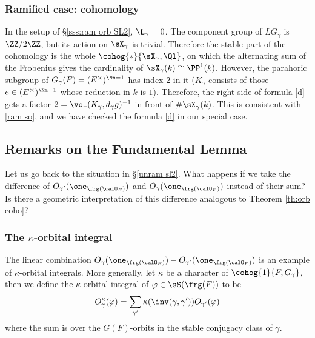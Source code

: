 \subsubsection{Ramified case: cohomology} In the setup of \S\ref{sss:ram orb SL2}, $\L_{\gamma}=0$. The component group of $LG_{\gamma}$ is $\ZZ/2\ZZ$, but its action on $\sX_{\gamma}$ is trivial. Therefore the stable part of the cohomology is the whole $\cohog{*}{\sX_{\gamma},\Ql}$, on which the alternating sum of the Frobenius gives the cardinality of $\sX_{\gamma}(k)\cong\PP^{1}(k)$.
However, the parahoric subgroup of $G_{\gamma}(F)=(E^{\times})^{\Nm=1}$ has index $2$ in it ($K_{\gamma}$ consists of those $e\in (E^{\times})^{\Nm=1}$ whose reduction in $k$ is $1$). Therefore, the right side of formula \eqref{d} gets a factor $2=\vol(K_{\gamma},d_{\gamma}g)^{-1}$ in front of $\#\sX_{\gamma}(k)$. This is consistent with \eqref{ram so}, and we have checked the formula \eqref{d} in our special case.

\subsection{Remarks on the Fundamental Lemma} Let us go back to the situation in  \S\ref{unram sl2}. What happens if we take the difference of $O_{\gamma'}(\one_{\frg(\calO_{F})})$ and $O_{\gamma}(\one_{\frg(\calO_{F})})$ instead of their sum? Is there a geometric interpretation of this difference analogous to Theorem \ref{th:orb coho}?

\subsubsection{The $\kappa$-orbital integral} The linear combination $O_{\gamma}(\one_{\frg(\calO_{F})})-O_{\gamma'}(\one_{\frg(\calO_{F})})$ is an example of $\kappa$-orbital integrals. More generally, let $\kappa$ be a character of $\cohog{1}{F,G_{\gamma}}$, then we define the $\kappa$-orbital integral of $\varphi\in \sS(\frg(F))$ to be
\begin{equation*}
O^{\kappa}_{\gamma}(\varphi)=\sum_{\gamma'}\kappa(\inv(\gamma,\gamma'))O_{\gamma'}(\varphi)
\end{equation*}
where the sum is over the $G(F)$-orbits in the stable conjugacy class of $\gamma$.


